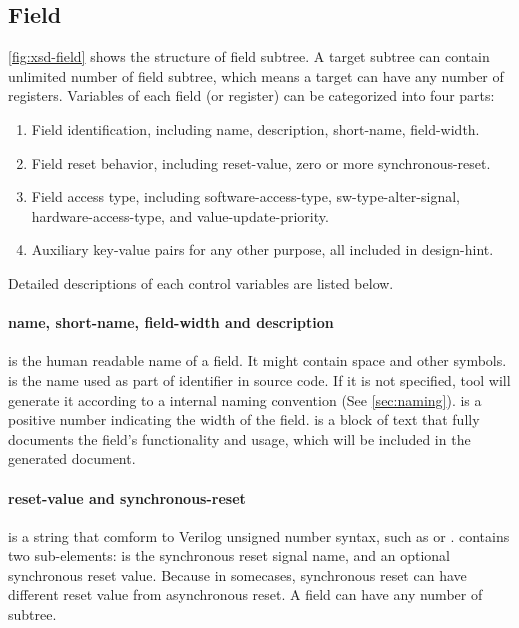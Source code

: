 \documentclass[10pt,oneside]{book}
\begin{document}
\subsection{Field}
\autoref{fig:xsd-field} shows the structure of field subtree. A target 
subtree can contain unlimited number of field subtree, which means a \gls{target}
can have any number of registers. Variables of each field (or register) 
can be categorized into four parts:
\begin{enumerate}
\item Field identification, including name, description, short-name, field-width. 
\item Field reset behavior, including reset-value, zero or more synchronous-reset.
\item Field access type, including software-access-type, sw-type-alter-signal,
   hardware-access-type, and value-update-priority.
\item Auxiliary key-value pairs for any other purpose, all included in design-hint.  
\end{enumerate}
Detailed descriptions of each control variables are listed below.

\paragraph{name, short-name, field-width and description}
 is the human readable name of a field. 
It might contain space and other symbols.
 is the name used as part of identifier in
source code. If it is not specified, tool will generate it according to a
internal naming convention (See \autoref{sec:naming}). 
 is a positive number indicating the width 
of the field. 
 is a block of text that fully documents the field's functionality and usage, 
which will be included in the generated document. 

\paragraph{reset-value and synchronous-reset} 
 is a string that comform to 
Verilog unsigned number syntax, such as  or . 
 contains two sub-elements:
 is the synchronous reset signal name, 
and an optional synchronous reset value. Because in somecases, synchronous
reset can have different reset value from asynchronous reset. A \gls{field}
can have any number of  subtree. 
\end{document}
